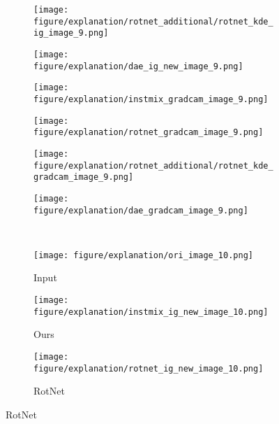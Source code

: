 \documentclass{article} \usepackage{iclr2021_conference,times}
\begin{document}
\begin{figure}[h!]
\begin{subfigure}{.11\textwidth}
\end{subfigure}
\hspace{-2mm}
\begin{subfigure}{.11\textwidth}
  \centering
  \texttt{[image: figure/explanation/rotnet\_additional/rotnet\_kde\_ig\_image\_9.png]}
\end{subfigure}
\hspace{-2mm}
\begin{subfigure}{.11\textwidth}
  \centering
  \texttt{[image: figure/explanation/dae\_ig\_new\_image\_9.png]}
\end{subfigure}
\hspace{-2mm}
\begin{subfigure}{.11\textwidth}
  \centering
  \texttt{[image: figure/explanation/instmix\_gradcam\_image\_9.png]}
\end{subfigure}
\hspace{-2mm}
\begin{subfigure}{.11\textwidth}
  \centering
  \texttt{[image: figure/explanation/rotnet\_gradcam\_image\_9.png]}
\end{subfigure}
\hspace{-2mm}
\begin{subfigure}{.11\textwidth}
  \centering
  \texttt{[image: figure/explanation/rotnet\_additional/rotnet\_kde\_gradcam\_image\_9.png]}
\end{subfigure}
\hspace{-2mm}
\begin{subfigure}{.11\textwidth}
  \centering
  \texttt{[image: figure/explanation/dae\_gradcam\_image\_9.png]}
\end{subfigure}\\
\begin{subfigure}{.11\textwidth}
  \centering
  \texttt{[image: figure/explanation/ori\_image\_10.png]}
  \caption{Input}
\end{subfigure}
\hspace{-2mm}
\begin{subfigure}{.11\textwidth}
  \centering
  \texttt{[image: figure/explanation/instmix\_ig\_new\_image\_10.png]}
  \caption{Ours}
\end{subfigure}
\hspace{-2mm}
\begin{subfigure}{.11\textwidth}
  \centering
  \texttt{[image: figure/explanation/rotnet\_ig\_new\_image\_10.png]}
  \caption{RotNet}
\end{subfigure}

\end{figure}
\end{document}

